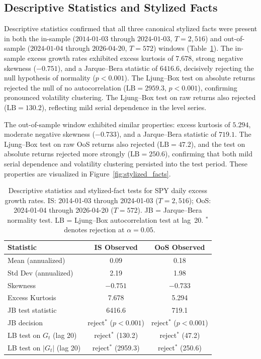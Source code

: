 \subsection{Descriptive Statistics and Stylized Facts}
\label{sec:descriptive}

Descriptive statistics confirmed that all three canonical stylized facts were present in both the in-sample ($2014$-$01$-$03$ through $2024$-$01$-$03$, $T = 2{,}516$) and out-of-sample ($2024$-$01$-$04$ through $2026$-$04$-$20$, $T = 572$) windows (Table~\ref{tab:descriptive}).
The in-sample excess growth rates exhibited excess kurtosis of $7.678$, strong negative skewness ($-0.751$), and a Jarque--Bera statistic of $6416.6$, decisively rejecting the null hypothesis of normality ($p < 0.001$).
The Ljung--Box test on absolute returns rejected the null of no autocorrelation ($\text{LB} = 2959.3$, $p < 0.001$), confirming pronounced volatility clustering.
The Ljung--Box test on raw returns also rejected ($\text{LB} = 130.2$), reflecting mild serial dependence in the level series.

The out-of-sample window exhibited similar properties: excess kurtosis of $5.294$, moderate negative skewness ($-0.733$), and a Jarque--Bera statistic of $719.1$.
The Ljung--Box test on raw OoS returns also rejected ($\text{LB} = 47.2$), and the test on absolute returns rejected more strongly ($\text{LB} = 250.6$), confirming that both mild serial dependence and volatility clustering persisted into the test period.
These properties are visualized in Figure~\ref{fig:stylized_facts}.

\begin{table}[t]
\centering
\caption{Descriptive statistics and stylized-fact tests for SPY daily excess growth rates. IS: 2014-01-03 through 2024-01-03 ($T = 2{,}516$); OoS: 2024-01-04 through 2026-04-20 ($T = 572$). JB = Jarque--Bera normality test. LB = Ljung--Box autocorrelation test at lag~20. $^*$~denotes rejection at $\alpha = 0.05$.}
\label{tab:descriptive}
\begin{tabular}{lcc}
\toprule
Statistic & IS Observed & OoS Observed \\
\midrule
Mean (annualized) & 0.09 & 0.18 \\
Std Dev (annualized) & 2.19 & 1.98 \\
Skewness & $-0.751$ & $-0.733$ \\
Excess Kurtosis & 7.678 & 5.294 \\
JB test statistic & 6416.6 & 719.1 \\
JB decision & reject$^*$ ($p < 0.001$) & reject$^*$ ($p < 0.001$) \\
LB test on $G_t$ (lag 20) & reject$^*$ (130.2) & reject$^*$ (47.2) \\
LB test on $|G_t|$ (lag 20) & reject$^*$ (2959.3) & reject$^*$ (250.6) \\
\bottomrule
\end{tabular}
\end{table}

